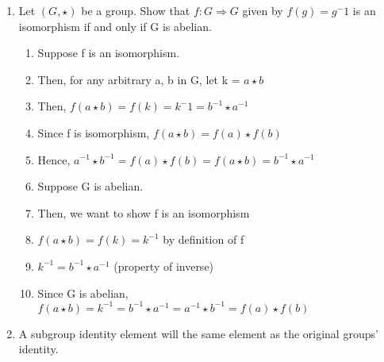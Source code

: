 \documentclass{article}
\begin{document}
\begin{enumerate}
\item Let $ (G, \star) $ be a group. Show that $f: G \Rightarrow G $ given by
$ f(g) = g^-1 $ is an isomorphism if and only if G is abelian.

\begin{enumerate}

\item Suppose f is an isomorphism.
\item Then, for any arbitrary a, b in G, let k = $ a \star b $
\item Then, $f(a \star b) = f(k) = k^-1 = b^{-1} \star a^{-1} $
\item Since f is isomorphism, $f(a \star b) = f(a) \star f(b) $
\item Hence, $ a^{-1} \star b^{-1} = f(a) \star f(b) = f(a \star b) = b^{-1} \star a^{-1} $

\item Suppose G is abelian.
\item Then, we want to show f is an isomorphism
\item $f(a \star b) = f(k) = k^{-1} $ by definition of f
\item $ k^{-1} = b^{-1} \star a^{-1} $ (property of inverse)
\item Since G is abelian, $f(a \star b) = k^{-1} = b^{-1} \star a^{-1} = a^{-1}
\star b^{-1} = f(a) \star f(b) $
\end{enumerate}

\item A subgroup identity element will the same element as the original groups'
identity.

\end{enumerate}
\end{document}
